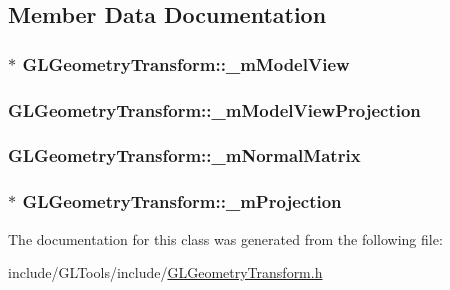 \subsection{Member Data Documentation}
\hypertarget{class_g_l_geometry_transform_a0f0d878692add5eeeac0e7b5713078bc}{
\subsubsection[{\-\_\-m\-Model\-View}]{$\ast$ G\-L\-Geometry\-Transform\-::\-\_\-m\-Model\-View\hspace{0.3cm}{\ttfamily [protected]}}}\label{class_g_l_geometry_transform_a0f0d878692add5eeeac0e7b5713078bc}
\hypertarget{class_g_l_geometry_transform_a01bbd7a1985a4674c7479f842d17d53d}{
\subsubsection[{\-\_\-m\-Model\-View\-Projection}]{ G\-L\-Geometry\-Transform\-::\-\_\-m\-Model\-View\-Projection\hspace{0.3cm}{\ttfamily [protected]}}}\label{class_g_l_geometry_transform_a01bbd7a1985a4674c7479f842d17d53d}
\hypertarget{class_g_l_geometry_transform_a3f1ea76d82d5c97d622d5e34c3f28467}{
\subsubsection[{\-\_\-m\-Normal\-Matrix}]{ G\-L\-Geometry\-Transform\-::\-\_\-m\-Normal\-Matrix\hspace{0.3cm}{\ttfamily [protected]}}}\label{class_g_l_geometry_transform_a3f1ea76d82d5c97d622d5e34c3f28467}
\hypertarget{class_g_l_geometry_transform_a566214dba8ce4d8f0e309d2283da3dea}{
\subsubsection[{\-\_\-m\-Projection}]{$\ast$ G\-L\-Geometry\-Transform\-::\-\_\-m\-Projection\hspace{0.3cm}{\ttfamily [protected]}}}\label{class_g_l_geometry_transform_a566214dba8ce4d8f0e309d2283da3dea}


The documentation for this class was generated from the following file\-:\begin{DoxyCompactItemize}
\item 
include/\-G\-L\-Tools/include/\hyperlink{_g_l_geometry_transform_8h}{G\-L\-Geometry\-Transform.\-h}\end{DoxyCompactItemize}

